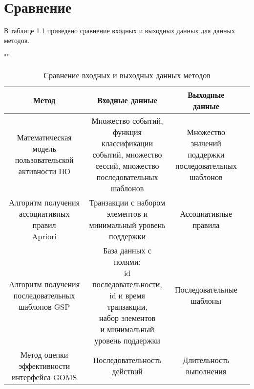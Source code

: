 \chapter{Сравнение}
\label{cha:research}

В таблице \ref{tab} приведено сравнение входных и выходных данных для данных методов.

\begin{table}[H]
	\begin{center}
		\caption{Сравнение входных и выходных данных методов}
		\label{tab}
		""\newline
		\begin{tabular}{ | c | c | c | c | }
			\hline
			Метод & Входные данные  & Выходные данные \\ \hline
			\specialcell{Математическая модель \\ пользовательской \\ активности ПО} & \specialcell{Множество событий, \\ функция классификации \\ событий, множество \\ сессий, множество \\ последовательных \\ шаблонов } & \specialcell{Множество \\ значений \\ поддержки \\ последовательных \\ шаблонов} \\ \hline
			\specialcell{Алгоритм получения \\ ассоциативных правил \\ Apriori} & \specialcell{Транзакции с набором \\ элементов и \\ минимальный уровень \\ поддержки} & \specialcell{Ассоциативные \\ правила} \\ \hline
			\specialcell{Алгоритм получения \\ последовательных \\ шаблонов GSP} & \specialcell{База данных с полями: \\ id последовательности, \\ id и время транзакции, \\ набор элементов \\ и минимальный \\ уровень поддержки} & \specialcell{Последовательные \\ шаблоны} \\ \hline
			\specialcell{Метод оценки \\ эффективности \\ интерфейса GOMS} & \specialcell{Последовательность \\ действий} & \specialcell{Длительность \\ выполнения} \\ \hline
		\end{tabular}
	\end{center}
\end{table}


